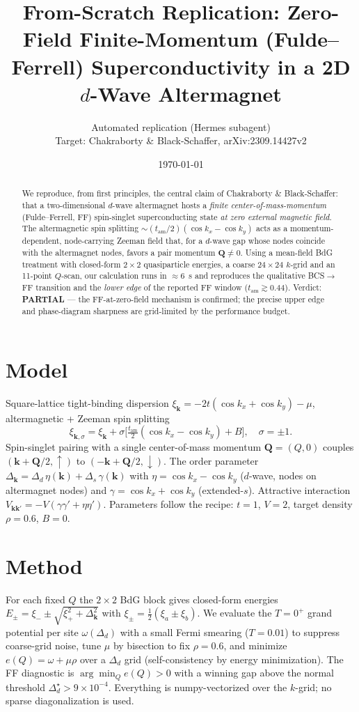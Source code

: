 \documentclass[11pt]{article}
\title{From-Scratch Replication: Zero-Field Finite-Momentum (Fulde--Ferrell)
Superconductivity in a 2D $d$-Wave Altermagnet}
\author{Automated replication (Hermes subagent)\\
Target: Chakraborty \& Black-Schaffer, arXiv:2309.14427v2}
\date{\today}
\begin{document}
\maketitle

\begin{abstract}
We reproduce, from first principles, the central claim of Chakraborty \&
Black-Schaffer: that a two-dimensional $d$-wave altermagnet hosts a
\emph{finite center-of-mass-momentum} (Fulde--Ferrell, FF) spin-singlet
superconducting state \emph{at zero external magnetic field}. The
altermagnetic spin splitting $\sim(t_{\mathrm{am}}/2)(\cos k_x-\cos k_y)$
acts as a momentum-dependent, node-carrying Zeeman field that, for a $d$-wave
gap whose nodes coincide with the altermagnet nodes, favors a pair momentum
$\mathbf{Q}\neq 0$. Using a mean-field BdG treatment with closed-form
$2\times2$ quasiparticle energies, a coarse $24\times24$ $k$-grid and an
11-point $Q$-scan, our calculation runs in $\approx 6$~s and reproduces the
qualitative BCS$\to$FF transition and the \emph{lower edge} of the reported
FF window ($t_{\mathrm{am}}\gtrsim0.44$). Verdict: \textbf{PARTIAL} --- the
FF-at-zero-field mechanism is confirmed; the precise upper edge and phase-diagram
sharpness are grid-limited by the performance budget.
\end{abstract}

\section{Model}
Square-lattice tight-binding dispersion $\xi_{\mathbf k}=-2t(\cos k_x+\cos k_y)-\mu$,
altermagnetic + Zeeman spin splitting
\begin{equation}
\xi_{\mathbf k,\sigma}=\xi_{\mathbf k}+\sigma\Big[\tfrac{t_{\mathrm{am}}}{2}(\cos k_x-\cos k_y)+B\Big],\quad \sigma=\pm1 .
\end{equation}
Spin-singlet pairing with a single center-of-mass momentum $\mathbf Q=(Q,0)$
couples $(\mathbf k+\mathbf Q/2,\uparrow)$ to $(-\mathbf k+\mathbf Q/2,\downarrow)$.
The order parameter $\Delta_{\mathbf k}=\Delta_d\,\eta(\mathbf k)+\Delta_s\,\gamma(\mathbf k)$
with $\eta=\cos k_x-\cos k_y$ ($d$-wave, nodes on altermagnet nodes) and
$\gamma=\cos k_x+\cos k_y$ (extended-$s$). Attractive interaction
$V_{\mathbf{k k'}}=-V(\gamma\gamma'+\eta\eta')$. Parameters follow the recipe:
$t=1$, $V=2$, target density $\rho=0.6$, $B=0$.

\section{Method}
For each fixed $Q$ the $2\times2$ BdG block gives closed-form energies
$E_\pm=\xi_-\pm\sqrt{\xi_+^2+\Delta_{\mathbf k}^2}$ with
$\xi_\pm=\tfrac12(\xi_a\pm\xi_b)$. We evaluate the $T=0^+$ grand potential per
site $\omega(\Delta_d)$ with a small Fermi smearing ($T=0.01$) to suppress
coarse-grid noise, tune $\mu$ by bisection to fix $\rho=0.6$, and minimize
$e(Q)=\omega+\mu\rho$ over a $\Delta_d$ grid (self-consistency by energy
minimization). The FF diagnostic is $\arg\min_Q e(Q)>0$ with a winning gap
above the normal threshold $\Delta_d^\star>9\times10^{-4}$. Everything is
numpy-vectorized over the $k$-grid; no sparse diagonalization is used.
\end{document}
